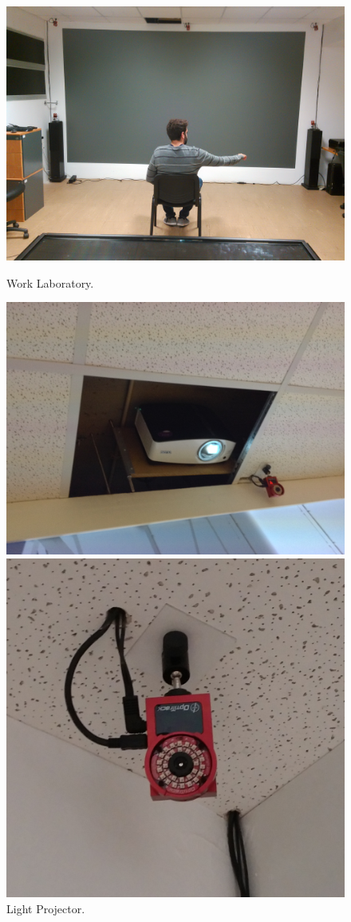 \begin{figure}[!t]
  \centering
  \includegraphics[width=\linewidth]{imgs/impl/laboratory}
    \caption{Work Laboratory.}
    \label{fig:laboratory}
    \endminipage\hfill
{}
  \centering
  \includegraphics[width=\linewidth]{imgs/impl/projector}
    \caption{Light Projector.}
    \label{fig:projector}
    \endminipage\hfill
{}
  \centering
  \includegraphics[width=0.75\linewidth]{imgs/impl/optitracksensor}

\end{figure}
